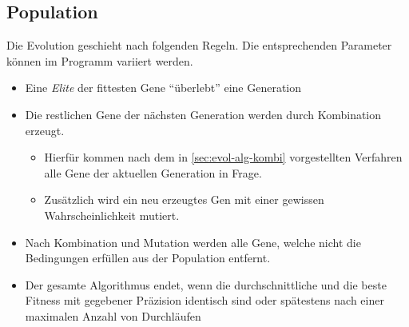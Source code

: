  \subsection{Population}
Die Evolution geschieht nach folgenden Regeln.
Die entsprechenden Parameter können im Programm variiert werden.
\begin{itemize}
    \item Eine \emph{Elite} der fittesten Gene \enquote{überlebt} eine Generation
    \item Die restlichen Gene der nächsten Generation werden durch Kombination erzeugt.
    \begin{itemize}
        \item Hierfür kommen nach dem in \autoref{sec:evol-alg-kombi} vorgestellten Verfahren alle Gene der aktuellen Generation in Frage.
        \item Zusätzlich wird ein neu erzeugtes Gen mit einer gewissen Wahrscheinlichkeit mutiert.
    \end{itemize}
    \item Nach Kombination und Mutation werden alle Gene, welche nicht die Bedingungen erfüllen aus der Population entfernt.
    \item Der gesamte Algorithmus endet, wenn die durchschnittliche und die beste Fitness mit gegebener Präzision identisch sind oder spätestens nach einer maximalen Anzahl von Durchläufen
\end{itemize}